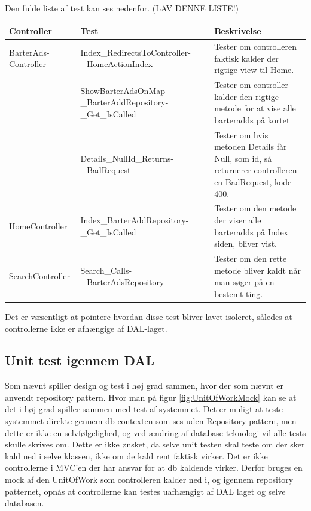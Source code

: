 Den fulde liste af test kan ses nedenfor.
(LAV DENNE LISTE!)
\setlength{\arrayrulewidth}{0.3mm}
\setlength{\tabcolsep}{2pt}
\renewcommand{\arraystretch}{1.5}
\begin{table}[H]
	\begin{tabular}{ | p{3.0cm} | p{5.5cm} | p{8.0cm} | }
		\hline
		\textbf{Controller} & \textbf{Test} & \textbf{Beskrivelse} \\
		\hline
		BarterAds-Controller &  Index\_RedirectsToController-\_HomeActionIndex & Tester om controlleren faktisk kalder der rigtige view til Home. \\
		\hline
		& ShowBarterAdsOnMap-\_BarterAddRepository-\_Get\_IsCalled & Tester om controller kalder den rigtige metode for at vise alle barteradds på kortet\\
		\hline
		& Details\_NullId\_Returns-\_BadRequest & Tester om hvis metoden Details får Null, som id, så returnerer controlleren en BadRequest, kode 400. \\
		\hline
		HomeController & Index\_BarterAddRepository-\_Get\_IsCalled & Tester om den metode der viser alle barteradds på Index siden, bliver vist. \\
		\hline
		SearchController & Search\_Calls-\_BarterAdsRepository & Tester om den rette metode bliver kaldt når man søger på en bestemt ting. \\
		\hline
		
		
		
	\end{tabular}
\end{table}

Det er væsentligt at pointere hvordan disse test bliver lavet isoleret, således at controllerne ikke er afhængige af DAL-laget.

\subsection{Unit test igennem DAL}

Som nævnt spiller design og test i høj grad sammen, hvor der som nævnt er anvendt repository pattern. Hvor man på figur \ref{fig:UnitOfWorkMock} kan se at det i høj grad spiller sammen med test af systemmet. Det er muligt at teste systemmet direkte gennem db contexten som ses uden Repository pattern, men dette er ikke en selvfølgelighed, og ved ændring af database teknologi vil alle tests skulle skrives om. Dette er ikke ønsket, da selve unit testen skal teste om der sker kald ned i selve klassen, ikke om de kald rent faktisk virker. Det er ikke controllerne i MVC'en der har ansvar for at db kaldende virker. Derfor bruges en mock af den UnitOfWork som controlleren kalder ned i, og igennem repository patternet, opnås at controllerne kan testes uafhængigt af DAL laget og selve databasen.

